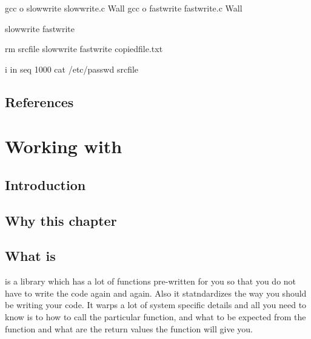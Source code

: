 \documentclass[letterpaper,10pt,english]{sphinxmanual}
\begin{document}
\begin{sphinxVerbatim}[commandchars=\\\{\},numbers=left,firstnumber=1,stepnumber=1]
	gcc \PYGZhy{}o slow\PYGZus{}write slow\PYGZus{}write.c \PYGZhy{}Wall
	gcc \PYGZhy{}o fast\PYGZus{}write fast\PYGZus{}write.c \PYGZhy{}Wall

	 slow\PYGZus{}write
	 fast\PYGZus{}write

	rm src\PYGZus{}file slow\PYGZus{}write fast\PYGZus{}write copied\PYGZus{}file.txt

	 i in seq  1000  cat /etc/passwd \PYGZgt{}\PYGZgt{} src\PYGZus{}file  
\end{sphinxVerbatim}


\section{References}
\label{\detokenize{02_system_calls:references}}

\chapter{Working with }
\label{\detokenize{03_glibc:working-with-glibc}}\label{\detokenize{03_glibc::doc}}

\section{Introduction}
\label{\detokenize{03_glibc:introduction}}

\section{Why this chapter}
\label{\detokenize{03_glibc:why-this-chapter}}

\section{What is }
\label{\detokenize{03_glibc:what-is-glibc}}
 is a library which has a lot of functions pre-written for you so that
you do not have to write the code again and again. Also it statndardizes the
way you should be writing your code. It warps a lot of system specific details
and all you need to know is to how to call the particular function, and what to
be expected from the function and what are the return values the function will
give you.
\end{document}
